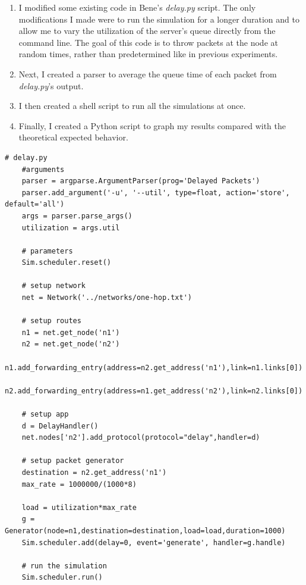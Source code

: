 \documentclass[11pt]{article}
\begin{document}
\begin{enumerate}

\item I modified some existing code in Bene's \emph{delay.py} script. The only modifications I made were to run the simulation for a longer duration and to allow me to vary the utilization of the server's queue directly from the command line. The goal of this code is to throw packets at the node at random times, rather than predetermined like in previous experiments.

\item Next, I created a parser to average the queue time of each packet from \emph{delay.py}'s output. 

\item I then created a shell script to run all the simulations at once. 

\item Finally, I created a Python script to graph my results compared with the theoretical expected behavior.

\end{enumerate}

\vspace{5mm}
\begin{absolutelynopagebreak}
\begin{lstlisting}
# delay.py
    #arguments
    parser = argparse.ArgumentParser(prog='Delayed Packets')
    parser.add_argument('-u', '--util', type=float, action='store', default='all')
    args = parser.parse_args()
    utilization = args.util

    # parameters
    Sim.scheduler.reset()

    # setup network
    net = Network('../networks/one-hop.txt')

    # setup routes
    n1 = net.get_node('n1')
    n2 = net.get_node('n2')
    n1.add_forwarding_entry(address=n2.get_address('n1'),link=n1.links[0])
    n2.add_forwarding_entry(address=n1.get_address('n2'),link=n2.links[0])

    # setup app
    d = DelayHandler()
    net.nodes['n2'].add_protocol(protocol="delay",handler=d)

    # setup packet generator
    destination = n2.get_address('n1')
    max_rate = 1000000/(1000*8)

    load = utilization*max_rate
    g = Generator(node=n1,destination=destination,load=load,duration=1000)
    Sim.scheduler.add(delay=0, event='generate', handler=g.handle)
    
    # run the simulation
    Sim.scheduler.run()
\end{lstlisting}
\end{absolutelynopagebreak}
\end{document}
